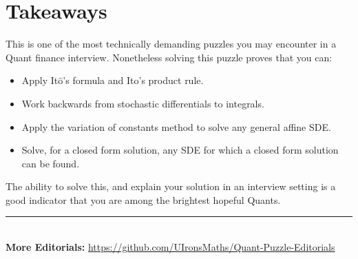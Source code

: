 \documentclass[12pt]{article}
\newcommand{\Itos}{It$\hat{\text{o}}$'s }
\begin{document}
\bigskip

\section*{Takeaways}
This is one of the most technically demanding puzzles you may encounter in a Quant finance interview. Nonetheless solving this puzzle proves that you can:

\begin{itemize}
    \item Apply \Itos formula and \Itos product rule.
    \item Work backwards from stochastic differentials to integrals.
    \item Apply the variation of constants method to solve any general affine SDE.
    \item Solve, for a closed form solution, any SDE for which a closed form solution can be found.
\end{itemize}

The ability to solve this, and explain your solution in an interview setting is a good indicator that you are among the brightest hopeful Quants.

\vspace*{\fill}
\begin{center}
    \rule{\linewidth}{0.5pt} \\
    \textbf{More Editorials:} \href{https://github.com/UIronsMaths/Quant-Puzzle-Editorials}{https://github.com/UIronsMaths/Quant-Puzzle-Editorials}
\end{center}
\end{document}
